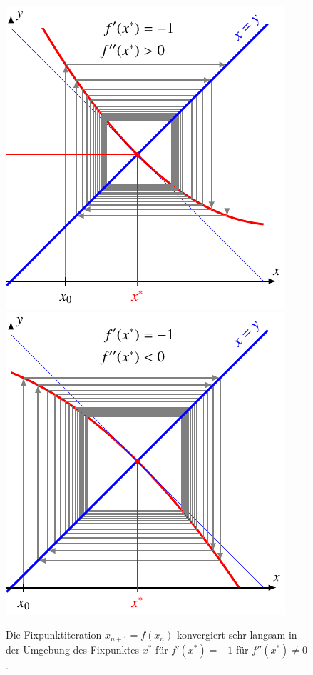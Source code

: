 \begin{figure}
\includegraphics{chapters/10-arithmetik/figures/mnqp.pdf}
\includegraphics{chapters/10-arithmetik/figures/mnqn.pdf}
\caption{Die Fixpunktiteration $x_{n+1}=f(x_n)$ konvergiert sehr langsam
in der Umgebung des Fixpunktes $x^*$ für
$f'(x^*)=-1$ für $f''(x^*)\ne 0$.
\label{buch:figure:fixpunkt:ablm1}}
\end{figure}
%
